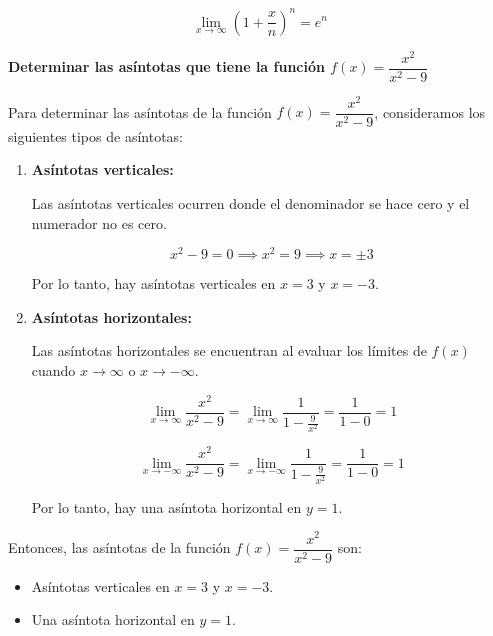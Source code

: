 \documentclass[answers]{exam} %
\begin{document}
\begin{questions}
\begin{solution}
\begin{enumerate}[label=\alph*.]
            \[
            \lim_{x \to \infty} \left(1 + \frac{x}{n}\right)^n = e^n
            \]
        \end{enumerate}
    \end{solution}
    

    \vspace{0.5cm}
    \question \large\textbf{Determinar las asíntotas que tiene la función \(f(x)=\dfrac{x^2}{x^2-9}\)}
    \begin{solution}
        Para determinar las asíntotas de la función \( f(x) = \dfrac{x^2}{x^2 - 9} \), consideramos los siguientes tipos de asíntotas:
    
        \begin{enumerate}
            \item \textbf{Asíntotas verticales:}
    
            Las asíntotas verticales ocurren donde el denominador se hace cero y el numerador no es cero.
    
            \[
            x^2 - 9 = 0 \implies x^2 = 9 \implies x = \pm 3
            \]
    
            Por lo tanto, hay asíntotas verticales en \( x = 3 \) y \( x = -3 \).
    
            \item \textbf{Asíntotas horizontales:}
    
            Las asíntotas horizontales se encuentran al evaluar los límites de \( f(x) \) cuando \( x \to \infty \) o \( x \to -\infty \).
    
            \[
            \lim_{x \to \infty} \dfrac{x^2}{x^2 - 9} = \lim_{x \to \infty} \dfrac{1}{1 - \frac{9}{x^2}} = \dfrac{1}{1 - 0} = 1
            \]
    
            \[
            \lim_{x \to -\infty} \dfrac{x^2}{x^2 - 9} = \lim_{x \to -\infty} \dfrac{1}{1 - \frac{9}{x^2}} = \dfrac{1}{1 - 0} = 1
            \]
    
            Por lo tanto, hay una asíntota horizontal en \( y = 1 \).
        \end{enumerate}
    
        Entonces, las asíntotas de la función \( f(x) = \dfrac{x^2}{x^2 - 9} \) son:
    
        \begin{itemize}
            \item Asíntotas verticales en \( x = 3 \) y \( x = -3 \).
            \item Una asíntota horizontal en \( y = 1 \).
        \end{itemize}
    \end{solution}
    


\end{questions}
\end{document}

